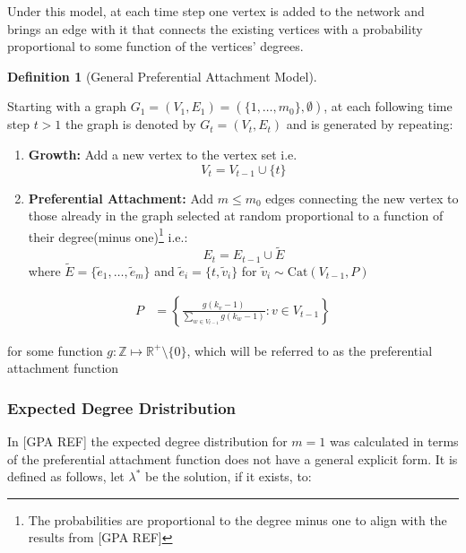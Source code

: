 \documentclass[
  10pt,
  a4paper,
]{scrreprt}
\providecommand{\tightlist}{%
  \setlength{\itemsep}{0pt}\setlength{\parskip}{0pt}}\usepackage{longtable,booktabs,array}
\theoremstyle{definition}
\newtheorem{definition}{Definition}[section]
\theoremstyle{plain}
\theoremstyle{remark}
\begin{document}
{Under this model, at each time step one vertex is added to the network
and brings an edge with it that connects the existing vertices with a
probability proportional to some function of the vertices' degrees.

\begin{definition}[General Preferential Attachment
Model]\protect\hypertarget{def-gpa}{}\label{def-gpa}

Starting with a graph
\(G_1 = (V_1, E_1) = (\{1,\ldots,m_0\}, \emptyset)\), at each following
time step \(t>1\) the graph is denoted by \(G_t = (V_t, E_t)\) and is
generated by repeating:

\begin{enumerate}
\def\labelenumi{\arabic{enumi}.}
\tightlist
\item
  \textbf{Growth:} Add a new vertex to the vertex set i.e. \[
  V_t = V_{t-1} \cup \{t\}
  \]
\item
  \textbf{Preferential Attachment:} Add \(m\le m_0\) edges connecting
  the new vertex to those already in the graph selected at random
  proportional to a function of their degree(minus one)\footnote{The
    probabilities are proportional to the degree minus one to align with
    the results from {[}GPA REF{]}} i.e.: \[
  E_t  = E_{t-1} \cup \tilde E
  \] where \(\tilde E = \{\tilde e_1,\ldots, \tilde e_m\}\) and
  \(\tilde e_i = \{t,\tilde v_i\}\) for
  \(\tilde v_i \sim \text{Cat}(V_{t-1}, P)\)
\end{enumerate}

\begin{align*}
P &= \left\{\displaystyle\frac{g(k_v-1)}{\sum_{w\in V_{t-1}} g(k_w-1)} : v \in V_{t-1}\right\}
\end{align*}

for some function \(g: \mathbb Z \mapsto \mathbb R^+\setminus\{0\}\),
which will be referred to as the preferential attachment function

\end{definition}

\hypertarget{expected-degree-dristribution}{%
\subsubsection{Expected Degree
Dristribution}\label{expected-degree-dristribution}}

In {[}GPA REF{]} the expected degree distribution for \(m=1\) was
calculated in terms of the preferential attachment function does not
have a general explicit form. It is defined as follows, let
\(\lambda^*\) be the solution, if it exists, to:

}
\end{document}
